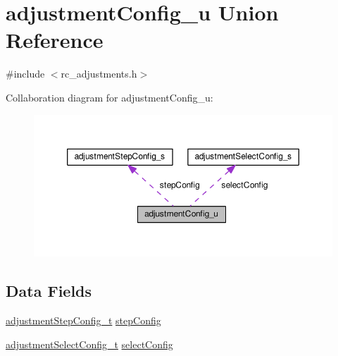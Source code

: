 \hypertarget{unionadjustmentConfig__u}{\section{adjustment\+Config\+\_\+u Union Reference}
\label{unionadjustmentConfig__u}
}


{\ttfamily \#include $<$rc\+\_\+adjustments.\+h$>$}



Collaboration diagram for adjustment\+Config\+\_\+u\+:\nopagebreak
\begin{figure}[H]
\begin{center}
\leavevmode
\includegraphics[width=350pt]{unionadjustmentConfig__u__coll__graph}
\end{center}
\end{figure}
\subsection*{Data Fields}
\begin{DoxyCompactItemize}
\item 
\hyperlink{io_2rc__adjustments_8h_a7575196e6a0691f62f900de58174ee3a}{adjustment\+Step\+Config\+\_\+t} \hyperlink{unionadjustmentConfig__u_aec7578f418f21a51cab1f8b217117b94}{step\+Config}
\item 
\hyperlink{io_2rc__adjustments_8h_a304071e0e7a461e004a89937710e7abe}{adjustment\+Select\+Config\+\_\+t} \hyperlink{unionadjustmentConfig__u_ad4390baf406e0f010b032ef9a3d72ddb}{select\+Config}
\end{DoxyCompactItemize}


